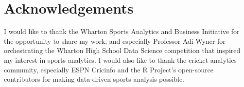\documentclass{article}[12pt]
\begin{document}
\section{Acknowledgements}

I would like to thank the Wharton Sports Analytics and Business Initiative for the opportunity to share my work, and especially Professor Adi Wyner for orchestrating the Wharton High School Data Science competition that inspired my interest in sports analytics. I would also like to thank the cricket analytics community, especially ESPN Cricinfo and the R Project's open-source contributors for making data-driven sports analysis possible.









\clearpage
{}

\printbibliography
\pagebreak
\end{document}
